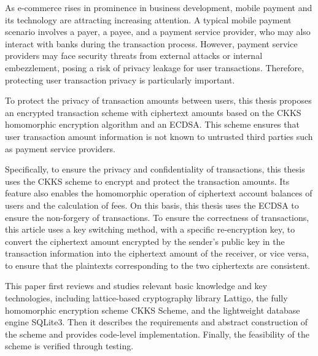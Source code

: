 \begin{enabstract}
As e-commerce rises in prominence in business development, mobile payment and its technology are attracting increasing attention. A typical mobile payment scenario involves a payer, a payee, and a payment service provider, who may also interact with banks during the transaction process. However, payment service providers may face security threats from external attacks or internal embezzlement, posing a risk of privacy leakage for user transactions. Therefore, protecting user transaction privacy is particularly important.

To protect the privacy of transaction amounts between users, this thesis proposes an encrypted transaction scheme with ciphertext amounts based on the CKKS homomorphic encryption algorithm and an ECDSA. This scheme ensures that user transaction amount information is not known to untrusted third parties such as payment service providers. 

Specifically, to ensure the privacy and confidentiality of transactions, this thesis uses the CKKS scheme to encrypt and protect the transaction amounts. Its feature also enables the homomorphic operation of ciphertext account balances of users and the calculation of fees. On this basis, this thesis uses the ECDSA to ensure the non-forgery of transactions. To ensure the correctness of transactions, this article uses a key switching method, with a specific re-encryption key, to convert the ciphertext amount encrypted by the sender's public key in the transaction information into the ciphertext amount of the receiver, or vice versa, to ensure that the plaintexts corresponding to the two ciphertexts are consistent.

This paper first reviews and studies relevant basic knowledge and key technologies, including lattice-based cryptography library Lattigo, the fully homomorphic encryption scheme CKKS Scheme, and the lightweight database engine SQLite3. Then it describes the requirements and abstract construction of the scheme and provides code-level implementation. Finally, the feasibility of the scheme is verified through testing.
\end{enabstract}
